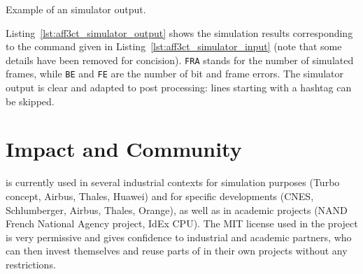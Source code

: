\begin{listing}[htp]
  \inputminted[frame=lines,linenos]{console}{main/chapter4/src/use_cases/simulator/output.txt}
  \caption{Example of an \AFFECT simulator output.}
  \label{lst:aff3ct_simulator_output}
\end{listing}

Listing~\ref{lst:aff3ct_simulator_output} shows the simulation results
corresponding to the \AFFECT command given in
Listing~\ref{lst:aff3ct_simulator_input} (note that some details have been
removed for concision). \verb|FRA| stands for the number of simulated frames,
while \verb|BE| and \verb|FE| are the number of bit and frame errors. The
simulator output is clear and adapted to post processing: lines starting with a
hashtag can be skipped.

\section{Impact and Community}
\label{sec:aff3ct_impact}

\AFFECT is currently used in several industrial contexts for simulation purposes
(Turbo concept, Airbus, Thales, Huawei) and for specific developments (CNES,
Schlumberger, Airbus, Thales, Orange), as well as in academic projects (NAND
French National Agency project, IdEx CPU). The MIT license used in the project
is very permissive and gives confidence to industrial and academic partners, who
can then invest themselves and reuse parts of \AFFECT in their own projects
without any restrictions.

